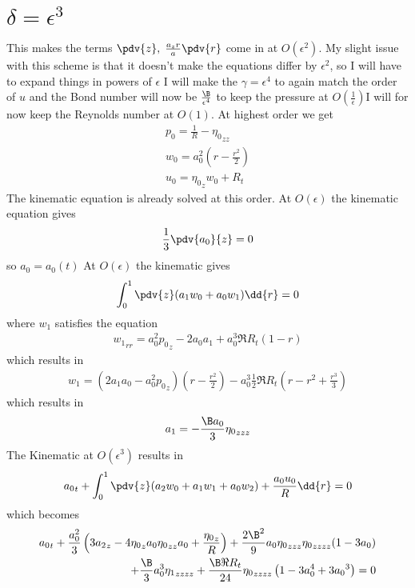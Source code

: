 \documentclass[12pt]{article}
\begin{document}
\section{$\delta = \epsilon^3$}
This makes the terms $\pdv{z}, \; \frac{a_zr}{a}\pdv{r}$ come in at $O(\epsilon^2)$.
My slight issue with this scheme is that it doesn't make the equations differ by $\epsilon^2$, so I will have to expand things in powers of $\epsilon$ I will make the $\gamma= \epsilon^4$ to again match the order of $u$ and the Bond number will now be $\frac{\B}{\epsilon^4}$ to keep the pressure at $O(\frac{1}{\epsilon})$I will for now keep the Reynolds number at $O(1)$.
At highest order we get 
\begin{align}
p_0 = \frac{1}{R} - {\eta_0}_{zz}\\
w_0 = a_0^2\left(r-\frac{r^2}{2}\right)\\
u_0 = {\eta_0}_z w_0 + R_t
\end{align}
The kinematic equation is already solved at this order.
At $O(\epsilon)$ the kinematic equation gives
\begin{align}
\frac{1}{3}\pdv{a_0}{z} =0
\end{align}
so $a_0 = a_0(t)$
At $O(\epsilon )$ the kinematic gives
\begin{align}
\int_{0}^1{\pdv{z}(a_1 w_0 + a_0 w_1)\dd{r}}=0
\end{align}
where $w_1$ satisfies the equation
\begin{align}
 {w_1}_{rr} = a_0^2{p_0}_z-2a_0a_1 +a_0^3\Re R_t(1-r) 
\end{align}
which results in 
\begin{align}
w_1  = (2a_1a_0- a_0^2{p_0}_z)\left(r-\frac{r^2}{2}\right)-a_0^3\frac{1}{2}\Re R_t \left(r-r^2+\frac{r^3}{3}\right)
\end{align}
which results in 
\begin{align}
a_1 = -\frac{\B a_0}{3}{\eta_0}_{zzz}
\end{align}
The Kinematic at $O(\epsilon^3)$ results in
\begin{align}
{a_0}_t+\int_{0}^1{\pdv{z}(a_2 w_0 + a_1 w_1+ a_0 w_2) +\frac{a_0u_0}{R}\dd{r}}=0
\end{align}
which becomes
\begin{align}
{a_0}_t+\frac{ a_0^2}{3} \left(3 {a_2}_z-4 {\eta _0}_z {a_0\eta _0}_{zz}a_0 +\frac{{\eta _0}_{z}}{R}\right)+\frac{2\B^2}{9} a_0 {\eta
	_0}_{zzz} {\eta _0}_{zzzz}(1 -3a_0)\\+\frac{\B}{3}a_0^3{\eta _1}_{zzzz}+\frac{\B\Re R_t}{24} {\eta _0}_{zzzz} \left(  1-3   a_0^4 +3a_0{}^3 
\right) = 0 
\end{align}
\end{document}
